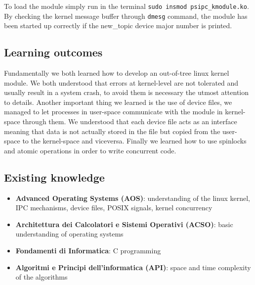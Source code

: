 \documentclass[10pt,a4]{article}
\newcommand{\code}[1]{\texttt{#1}}
\begin{document}
To load the module simply run in the terminal \code{sudo insmod psipc\_kmodule.ko}. By checking the kernel message buffer through \code{dmesg} command, the module has been started up correctly if the new\_topic device major number is printed.

\subsection{Learning outcomes}

Fundamentally we both learned how to develop an out-of-tree linux kernel module.
We both understood that errors at kernel-level are not tolerated and usually result in a system crash, to avoid them is necessary the utmost attention to details.
Another important thing we learned is the use of device files, we managed to let processes in user-space communicate with the module in kernel-space through them.
We understood that each device file acts as an interface meaning that data is not actually stored in the file but copied from the user-space to the kernel-space and viceversa.
Finally we learned how to use spinlocks and atomic operations in order to write concurrent code.

\subsection{Existing knowledge}
\begin{itemize}
  \item \textbf{Advanced Operating Systems (AOS)}: understanding of the linux kernel, IPC mechanisms, device files, POSIX signals, kernel concurrency
  \item \textbf{Architettura dei Calcolatori e Sistemi Operativi (ACSO)}: basic understanding of operating systems
  \item \textbf{Fondamenti di Informatica}: C programming
  \item \textbf{Algoritmi e Principi dell'informatica (API)}: space and time complexity of the algorithms
\end{itemize}
\end{document}
